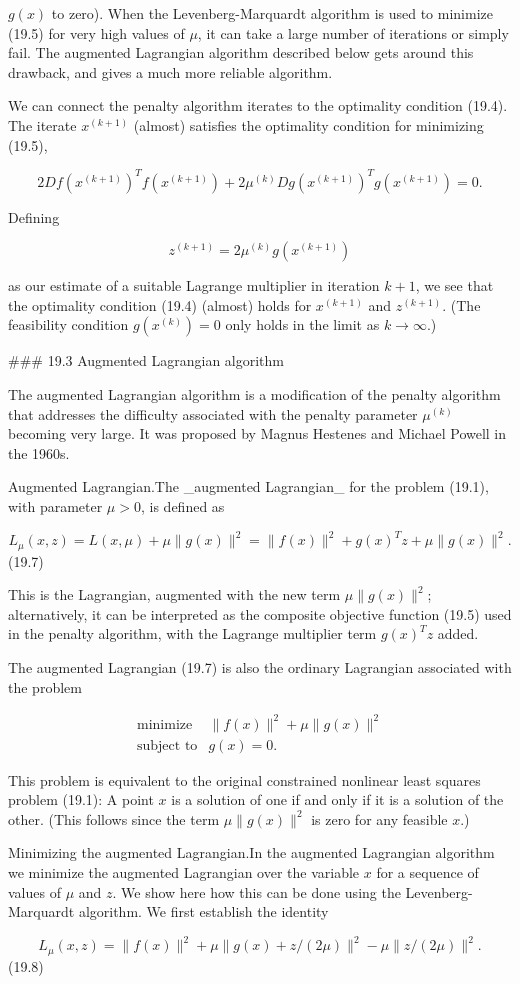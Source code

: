 \(g(x)\) to zero). When the Levenberg-Marquardt algorithm is used to minimize (19.5) for very high values of \(\mu\), it can take a large number of iterations or simply fail. The augmented Lagrangian algorithm described below gets around this drawback, and gives a much more reliable algorithm.

We can connect the penalty algorithm iterates to the optimality condition (19.4). The iterate \(x^{(k+1)}\) (almost) satisfies the optimality condition for minimizing (19.5),

\[2Df(x^{(k+1)})^{T}f(x^{(k+1)})+2\mu^{(k)}Dg(x^{(k+1)})^{T}g(x^{(k+1)})=0.\]

Defining

\[z^{(k+1)}=2\mu^{(k)}g(x^{(k+1)})\]

as our estimate of a suitable Lagrange multiplier in iteration \(k+1\), we see that the optimality condition (19.4) (almost) holds for \(x^{(k+1)}\) and \(z^{(k+1)}\). (The feasibility condition \(g(x^{(k)})=0\) only holds in the limit as \(k\to\infty\).)

### 19.3 Augmented Lagrangian algorithm

The augmented Lagrangian algorithm is a modification of the penalty algorithm that addresses the difficulty associated with the penalty parameter \(\mu^{(k)}\) becoming very large. It was proposed by Magnus Hestenes and Michael Powell in the 1960s.

Augmented Lagrangian.The _augmented Lagrangian_ for the problem (19.1), with parameter \(\mu>0\), is defined as

\[L_{\mu}(x,z)=L(x,\mu)+\mu\|g(x)\|^{2}=\|f(x)\|^{2}+g(x)^{T}z+\mu\|g(x)\|^{2}.\] (19.7)

This is the Lagrangian, augmented with the new term \(\mu\|g(x)\|^{2}\); alternatively, it can be interpreted as the composite objective function (19.5) used in the penalty algorithm, with the Lagrange multiplier term \(g(x)^{T}z\) added.

The augmented Lagrangian (19.7) is also the ordinary Lagrangian associated with the problem

\[\begin{array}{ll}\mbox{minimize}&\|f(x)\|^{2}+\mu\|g(x)\|^{2}\\ \mbox{subject to}&g(x)=0.\end{array}\]

This problem is equivalent to the original constrained nonlinear least squares problem (19.1): A point \(x\) is a solution of one if and only if it is a solution of the other. (This follows since the term \(\mu\|g(x)\|^{2}\) is zero for any feasible \(x\).)

Minimizing the augmented Lagrangian.In the augmented Lagrangian algorithm we minimize the augmented Lagrangian over the variable \(x\) for a sequence of values of \(\mu\) and \(z\). We show here how this can be done using the Levenberg-Marquardt algorithm. We first establish the identity

\[L_{\mu}(x,z)=\|f(x)\|^{2}+\mu\|g(x)+z/(2\mu)\|^{2}-\mu\|z/(2\mu)\|^{2}.\] (19.8) 